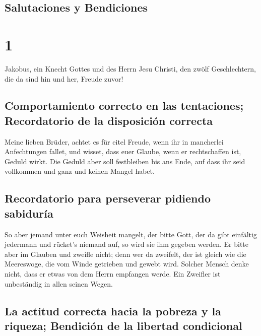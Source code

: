 \hypertarget{salutaciones-y-bendiciones}{%
\subsection{Salutaciones y
Bendiciones}\label{salutaciones-y-bendiciones}}

\hypertarget{section}{%
\section{1}\label{section}}

 Jakobus, ein Knecht Gottes und des Herrn Jesu Christi,
den zwölf Geschlechtern, die da sind hin und her, Freude zuvor!

\hypertarget{comportamiento-correcto-en-las-tentaciones-recordatorio-de-la-disposiciuxf3n-correcta}{%
\subsection{Comportamiento correcto en las tentaciones; Recordatorio de
la disposición
correcta}\label{comportamiento-correcto-en-las-tentaciones-recordatorio-de-la-disposiciuxf3n-correcta}}

 Meine lieben Brüder, achtet es für eitel Freude, wenn ihr
in mancherlei Anfechtungen fallet,  und wisset, dass euer
Glaube, wenn er rechtschaffen ist, Geduld wirkt.  Die
Geduld aber soll festbleiben bis ans Ende, auf dass ihr seid vollkommen
und ganz und keinen Mangel habet.

\hypertarget{recordatorio-para-perseverar-pidiendo-sabiduruxeda}{%
\subsection{Recordatorio para perseverar pidiendo
sabiduría}\label{recordatorio-para-perseverar-pidiendo-sabiduruxeda}}

 So aber jemand unter euch Weisheit mangelt, der bitte
Gott, der da gibt einfältig jedermann und rücket's niemand auf, so wird
sie ihm gegeben werden.  Er bitte aber im Glauben und
zweifle nicht; denn wer da zweifelt, der ist gleich wie die Meereswoge,
die vom Winde getrieben und gewebt wird.  Solcher Mensch
denke nicht, dass er etwas von dem Herrn empfangen werde. 
Ein Zweifler ist unbeständig in allen seinen Wegen.

\hypertarget{la-actitud-correcta-hacia-la-pobreza-y-la-riqueza-bendiciuxf3n-de-la-libertad-condicional}{%
\subsection{La actitud correcta hacia la pobreza y la riqueza; Bendición
de la libertad
condicional}\label{la-actitud-correcta-hacia-la-pobreza-y-la-riqueza-bendiciuxf3n-de-la-libertad-condicional}}

